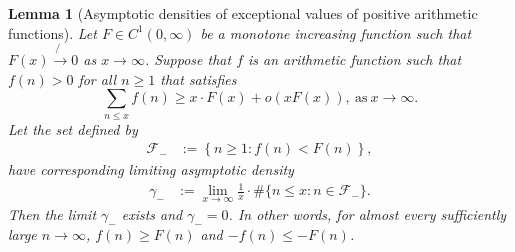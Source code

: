 \documentclass[11pt,reqno,a4letter]{article}
\numberwithin{figure}{section}
\numberwithin{table}{section}
\theoremstyle{plain}
\newtheorem{lemma}[theorem]{Lemma}
\numberwithin{theorem}{section}
\theoremstyle{definition}
\begin{document}
\begin{lemma}[Asymptotic densities of exceptional values of positive arithmetic functions] 
\label{lemma_AsymptoticDensitiesOfExceptionalSets_v1}
\label{remark_AsymptoticDensitiesOfExceptionalSets_v1}
Let $F \in C^{1}(0, \infty)$ be a monotone increasing function such that 
$F(x) \not{\rightarrow} 0$ as $x \rightarrow \infty$. 
Suppose that $f$ is an arithmetic function such that $f(n) > 0$ for all $n \geq 1$ that satisfies 
\[
\sum_{n \leq x} f(n) \geq x \cdot F(x) + o(xF(x)), \mathrm{\ as\ } x \rightarrow \infty. 
\]
Let the set defined by 
\begin{align*} 
\mathcal{F}_{-} & := \left\{n \geq 1: f(n) < F(n)\right\}, 
\end{align*} 
have corresponding limiting asymptotic density
\begin{align*} 
\gamma_{-} & := \lim_{x \rightarrow \infty} \frac{1}{x} \cdot \#\{n \leq x: n \in \mathcal{F}_{-}\}. 
\end{align*} 
Then the limit $\gamma_{-}$ exists and $\gamma_{-} = 0$. 
In other words, for almost every sufficiently large $n \rightarrow \infty$, 
$f(n) \geq F(n)$ and $-f(n) \leq -F(n)$. 
\end{lemma} 
\end{document}
